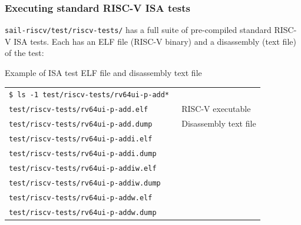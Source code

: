 \documentclass[aspectratio=169]{beamer}
\newcommand{\hmm}{\hspace*{2em}}
\newcommand{\scripttt}{\scriptsize\tt}
\newcommand{\slidefont}{\scriptsize}
\begin{document}
\begin{frame}
  \frametitle{Executing standard RISC-V ISA tests}

  {\scripttt sail-riscv/test/riscv-tests/} has a full suite of
  pre-compiled standard RISC-V ISA tests.  Each has an ELF file
  (RISC-V binary) and a disassembly (text file) of the test:

  \begin{block}{Example of ISA test ELF file and disassembly text file}
    \slidefont
    \begin{tabular}{ll}
      \tt \$ ls -1 test/riscv-tests/rv64ui-p-add* \hmm & \\
      \tt test/riscv-tests/rv64ui-p-add.elf            & RISC-V executable \\
      \tt test/riscv-tests/rv64ui-p-add.dump           & Disassembly text file \\
      \tt test/riscv-tests/rv64ui-p-addi.elf           & \\
      \tt test/riscv-tests/rv64ui-p-addi.dump          & \\
      \tt test/riscv-tests/rv64ui-p-addiw.elf          & \\
      \tt test/riscv-tests/rv64ui-p-addiw.dump         & \\
      \tt test/riscv-tests/rv64ui-p-addw.elf           & \\
      \tt test/riscv-tests/rv64ui-p-addw.dump          &
    \end{tabular}
  \end{block}

\end{frame}

\end{document}
